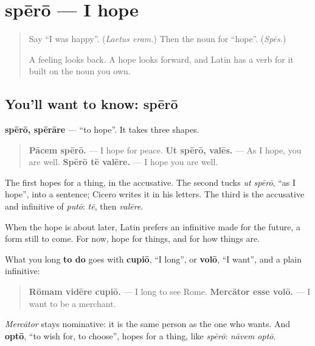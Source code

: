 \section[spērō, spērāre]{spērō — I hope}

\label{lesson:LA-C287-spero}



\begin{quote}
Say \textquotedblleft{}I was happy\textquotedblright{}. (\emph{Laetus eram.}) Then the noun for \textquotedblleft{}hope\textquotedblright{}. (\emph{Spēs.})

A feeling looks back. A hope looks forward, and Latin has a verb for it built on the noun you own.
\end{quote}

\subsection*{You'll want to know: spērō}
\textbf{spērō, spērāre} — \textquotedblleft{}to hope\textquotedblright{}. It takes three shapes.

\begin{quote}
\textbf{Pācem spērō.} — I hope for peace. \textbf{Ut spērō, valēs.} — As I hope, you are well. \textbf{Spērō tē valēre.} — I hope you are well.
\end{quote}

The first hopes for a thing, in the accusative. The second tucks \emph{ut spērō}, \textquotedblleft{}as I hope\textquotedblright{}, into a sentence; Cicero writes it in his letters. The third is the accusative and infinitive of \emph{putō}: \emph{tē}, then \emph{valēre}.

When the hope is about later, Latin prefers an infinitive made for the future, a form still to come. For now, hope for things, and for how things are.

\begin{grammarlens}[title={Grammar Lens: cupiō, volō + infinitive}]
What you long \textbf{to do} goes with \textbf{cupiō}, \textquotedblleft{}I long\textquotedblright{}, or \textbf{volō}, \textquotedblleft{}I want\textquotedblright{}, and a plain infinitive:

\begin{quote}
\textbf{Rōmam vidēre cupiō.} — I long to see Rome. \textbf{Mercātor esse volō.} — I want to be a merchant.
\end{quote}

\emph{Mercātor} stays nominative: it is the same person as the one who wants. And \textbf{optō}, \textquotedblleft{}to wish for, to choose\textquotedblright{}, hopes for a thing, like \emph{spērō}: \emph{nāvem optō}.
\end{grammarlens}

